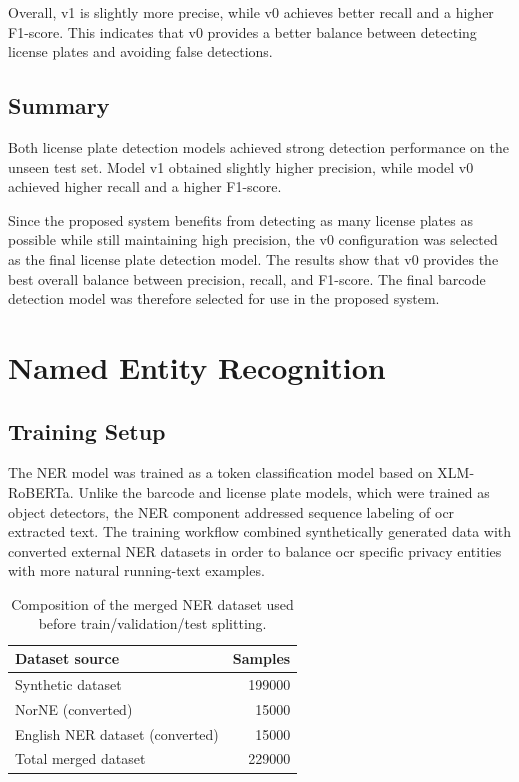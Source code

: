 Overall, v1 is slightly more precise, while v0 achieves better recall and a
higher F1-score. This indicates that v0 provides a better balance between
detecting license plates and avoiding false detections.

\subsection{Summary}

Both license plate detection models achieved strong detection performance on
the unseen test set. Model v1 obtained slightly higher precision, while model
v0 achieved higher recall and a higher F1-score.

Since the proposed system benefits from detecting as many license plates as
possible while still maintaining high precision, the v0 configuration was
selected as the final license plate detection model. The results show that v0
provides the best overall balance between precision, recall, and F1-score. The final barcode detection model was therefore selected for use in the proposed system.












\section{Named Entity Recognition}
\label{app:ner_evaluation}

\subsection{Training Setup}

The NER model was trained as a token classification model based on XLM-RoBERTa. Unlike the barcode and license plate models, which were trained as object detectors, the NER component addressed sequence labeling of \acrshort{ocr} extracted text. The training workflow combined synthetically generated data with converted external NER datasets in order to balance \acrshort{ocr} specific privacy entities with more natural running-text examples.

\begin{table}[H]
\centering
\begin{tabular}{l r}
\toprule
\textbf{Dataset source} & \textbf{Samples} \\
\midrule
Synthetic dataset & 199000 \\
NorNE (converted) \cite{norne_sprakbanken} & 15000 \\
English NER dataset (converted) \cite{kaggle_ner_dataset} & 15000 \\
\midrule
Total merged dataset & 229000 \\
\bottomrule
\end{tabular}
\caption{Composition of the merged NER dataset used before train/validation/test splitting.}
\label{tab:ner_dataset_composition}
\end{table}

